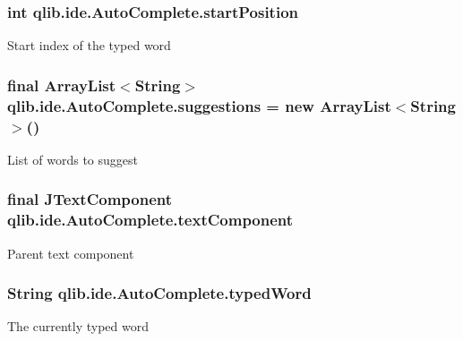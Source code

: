 \subsubsection[{\texorpdfstring{start\+Position}{startPosition}}]{\setlength{\rightskip}{0pt plus 5cm}int qlib.\+ide.\+Auto\+Complete.\+start\+Position\hspace{0.3cm}{\ttfamily [private]}}\hypertarget{classqlib_1_1ide_1_1AutoComplete_a7a588e36bc43ffbb782e6f43d89176a2}{}\label{classqlib_1_1ide_1_1AutoComplete_a7a588e36bc43ffbb782e6f43d89176a2}
Start index of the typed word 
\subsubsection[{\texorpdfstring{suggestions}{suggestions}}]{\setlength{\rightskip}{0pt plus 5cm}final Array\+List$<$String$>$ qlib.\+ide.\+Auto\+Complete.\+suggestions = new Array\+List$<$String$>$()\hspace{0.3cm}{\ttfamily [private]}}\hypertarget{classqlib_1_1ide_1_1AutoComplete_a547307db6247e63b17bad503504dbd22}{}\label{classqlib_1_1ide_1_1AutoComplete_a547307db6247e63b17bad503504dbd22}
List of words to suggest 
\subsubsection[{\texorpdfstring{text\+Component}{textComponent}}]{\setlength{\rightskip}{0pt plus 5cm}final J\+Text\+Component qlib.\+ide.\+Auto\+Complete.\+text\+Component\hspace{0.3cm}{\ttfamily [private]}}\hypertarget{classqlib_1_1ide_1_1AutoComplete_ab41cb720a8247194d0c4c2cc5fa6aeef}{}\label{classqlib_1_1ide_1_1AutoComplete_ab41cb720a8247194d0c4c2cc5fa6aeef}
Parent text component 
\subsubsection[{\texorpdfstring{typed\+Word}{typedWord}}]{\setlength{\rightskip}{0pt plus 5cm}String qlib.\+ide.\+Auto\+Complete.\+typed\+Word\hspace{0.3cm}{\ttfamily [private]}}\hypertarget{classqlib_1_1ide_1_1AutoComplete_add24423a55cac629e8316c5918a6d954}{}\label{classqlib_1_1ide_1_1AutoComplete_add24423a55cac629e8316c5918a6d954}
The currently typed word 
